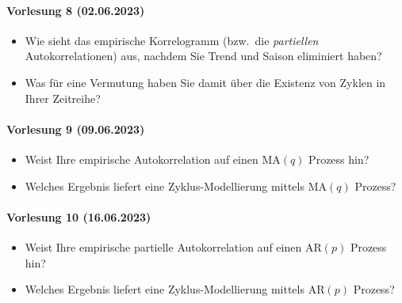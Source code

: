 \paragraph{Vorlesung 8 (02.06.2023)}
\begin{itemize}
    \item Wie sieht das empirische Korrelogramm (bzw.\ die \textit{partiellen} Autokorrelationen) aus, nachdem Sie Trend und Saison eliminiert haben? 
    \item Was für eine Vermutung haben Sie damit über die Existenz von Zyklen in Ihrer Zeitreihe?
\end{itemize}

\paragraph{Vorlesung 9 (09.06.2023)}
\begin{itemize}
    \item Weist Ihre empirische Autokorrelation auf einen $\text{MA}(q)$ Prozess hin?
    \item Welches Ergebnis liefert eine Zyklus-Modellierung mittels $\text{MA}(q)$ Prozess?
\end{itemize}

\paragraph{Vorlesung 10 (16.06.2023)}
\begin{itemize}
    \item Weist Ihre empirische partielle Autokorrelation auf einen $\text{AR}(p)$ Prozess hin?
    \item Welches Ergebnis liefert eine Zyklus-Modellierung mittels $\text{AR}(p)$ Prozess? 
\end{itemize}